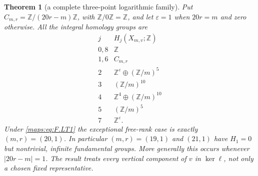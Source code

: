 \documentclass[11pt,a4paper]{article}
\newtheorem{theorem}{Theorem}[section]
\theoremstyle{definition}
\begin{document}
\begin{theorem}[a complete three-point logarithmic family]
Put $C_{m,r}=\mathbb Z/(20r-m)\mathbb Z$, with
$\mathbb Z/0\mathbb Z=\mathbb Z$, and let
$\varepsilon=1$ when $20r=m$ and zero otherwise.
All the integral homology groups are
\[
\begin{array}{c|c}
j&H_j(X_{m,v};\mathbb Z)\\ \hline
0,8&\mathbb Z\\
1,6&C_{m,r}\\
2&\mathbb Z^\varepsilon\oplus(\mathbb Z/m)^5\\
3&(\mathbb Z/m)^{10}\\
4&\mathbb Z^4\oplus(\mathbb Z/m)^{10}\\
5&(\mathbb Z/m)^5\\
7&\mathbb Z^\varepsilon .
\end{array}
\tag{F.LT3}\label{maps:eq:F.LT3}
\]
Under \eqref{maps:eq:F.LT1} the exceptional free-rank case is exactly
$(m,r)=(20,1)$.
In particular $(m,r)=(19,1)$ and $(21,1)$ have
$H_1=0$ but nontrivial, infinite fundamental groups.
More generally this occurs whenever $|20r-m|=1$.
The result treats every vertical component of $v$
in $\ker\ell$, not only a chosen fixed representative.

\end{theorem}
\end{document}
